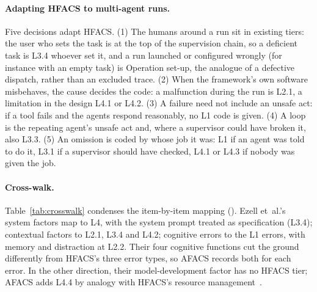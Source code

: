 \documentclass[11pt]{article}
\begin{document}
\paragraph{Adapting HFACS to multi-agent runs.}
\label{sec:people}
Five decisions adapt HFACS. (1) The humans around a run sit in existing tiers:
the user who sets the task is at the top of the supervision chain, so a deficient
task is L3.4 whoever set it, and a run launched or configured wrongly (for
instance with an empty task) is  Operation set-up, the analogue of a
defective dispatch, rather than an excluded trace. (2) When the framework's own
software misbehaves, the cause decides the code: a malfunction during the run is
L2.1, a limitation in the design L4.1 or L4.2. (3) A failure need not include an
unsafe act: if a tool fails and the agents respond reasonably, no L1 code is
given. (4) A loop is the repeating agent's unsafe act and, where a supervisor
could have broken it, also L3.3. (5) An omission is coded by whose job it was: L1
if an agent was told to do it, L3.1 if a supervisor should have checked, L4.1 or
L4.3 if nobody was given the job.

\paragraph{Cross-walk.} Table~\ref{tab:crosswalk} condenses the item-by-item
mapping (). Ezell et~al.'s system factors map to
L4, with the system prompt treated as specification (L3.4); contextual factors to
L2.1, L3.4 and L4.2; cognitive errors to the L1 errors, with memory and
distraction at L2.2. Their four cognitive functions cut the ground differently
from HFACS's three error types, so AFACS records both for each error. In the other
direction, their model-development factor has no HFACS tier; AFACS adds L4.4 by
analogy with HFACS's resource management~\cite{wiegmann2001commercial}.
\end{document}
